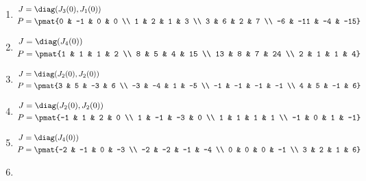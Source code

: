 \begin{enumerate}
\item

\begin{align*}
J &= \diag(J_{3}(0), J_{1}(0))\\
P &= \pmat{0 & -1 & 0 & 0 \\ 1 & 2 & 1 & 3 \\ 3 & 6 & 2 & 7 \\ -6 & -11 & -4 & -15}
\end{align*}

\item

\begin{align*}
J &= \diag(J_{4}(0))\\
P &= \pmat{1 & 1 & 1 & 2 \\ 8 & 5 & 4 & 15 \\ 13 & 8 & 7 & 24 \\ 2 & 1 & 1 & 4}
\end{align*}

\item

\begin{align*}
J &= \diag(J_{2}(0), J_{2}(0))\\
P &= \pmat{3 & 5 & -3 & 6 \\ -3 & -4 & 1 & -5 \\ -1 & -1 & -1 & -1 \\ 4 & 5 & -1 & 6}
\end{align*}

\item

\begin{align*}
J &= \diag(J_{2}(0), J_{2}(0))\\
P &= \pmat{-1 & 1 & 2 & 0 \\ 1 & -1 & -3 & 0 \\ 1 & 1 & 1 & 1 \\ -1 & 0 & 1 & -1}
\end{align*}

\item

\begin{align*}
J &= \diag(J_{4}(0))\\
P &= \pmat{-2 & -1 & 0 & -3 \\ -2 & -2 & -1 & -4 \\ 0 & 0 & 0 & -1 \\ 3 & 2 & 1 & 6}
\end{align*}

\item


\end{enumerate}
